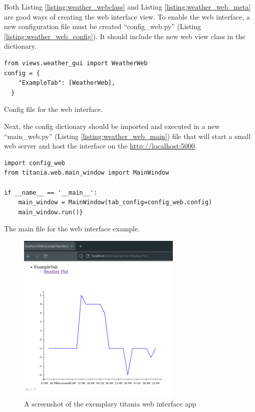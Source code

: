 Both Listing \ref{listing:weather_webclass} and Listing \ref{listing:weather_web_meta} are good ways of creating the web interface view.
To enable the web interface, a new configuration file must be created ``config\_web.py'' (Listing \ref{listing:weather_web_config}). It should include the new web view class in the dictionary.

\begin{listing}[!ht]
\begin{verbatim}
from views.weather_gui import WeatherWeb
config = {
    "ExampleTab": [WeatherWeb],
  }
\end{verbatim}
\caption{Config file for the web interface.}
\label{listing:weather_web_config}
\end{listing}

Next, the config dictionary should be imported and executed in a new ``main\_web.py'' (Listing \ref{listing:weather_web_main}) file that will start a small web server and host the interface on the \href{http://localhost:5000}{http://localhost:5000}.

\begin{listing}[!h]
\begin{verbatim}
import config_web
from titania.web.main_window import MainWindow

if __name__ == '__main__':
    main_window = MainWindow(tab_config=config_web.config)
    main_window.run()}
\end{verbatim}
\caption{The main file for the web interface example.}
\label{listing:weather_web_main}
\end{listing}


\begin{figure}[H]
\centering
\includegraphics[width=0.7\textwidth]{figures/chapter5/titania/titania_weather_web.png}
\caption{A screenshot of the exemplary titania web interface app }
\label{fig:titaniawebinterface}
\end{figure}

